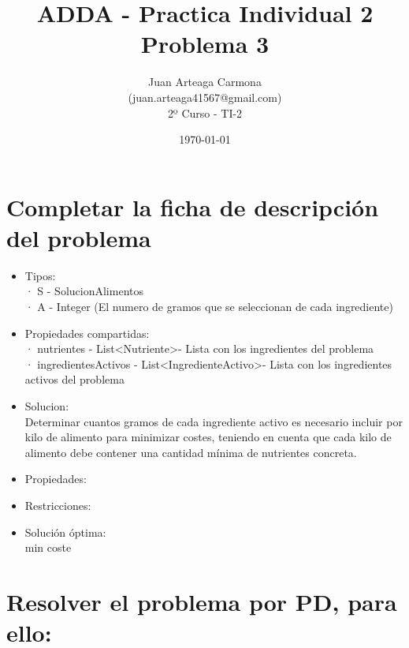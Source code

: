 \documentclass[a4paper,12pt]{article}
\title{ADDA - Practica Individual 2\\ Problema 3}
\author{Juan Arteaga Carmona\\(juan.arteaga41567@gmail.com)\\2º Curso - TI-2}
\date{\today}
\begin{document}
\maketitle

\section{Completar la ficha de descripción del problema}

\begin{itemize}
 \item Tipos:\\
 · S - SolucionAlimentos\\
 · A - Integer \in [0,1000] (El numero de gramos que se seleccionan de cada ingrediente)

 \item Propiedades compartidas:\\
 · nutrientes - List\textless Nutriente\textgreater - Lista con los ingredientes del problema\\
 · ingredientesActivos - List\textless IngredienteActivo\textgreater - Lista con los ingredientes activos del problema

 \item Solucion:\\
Determinar cuantos gramos de cada ingrediente activo es necesario incluir por kilo
de alimento para minimizar costes, teniendo en cuenta que cada kilo de alimento debe
contener una cantidad mínima de nutrientes concreta.

\item Propiedades:\\

\item Restricciones:

\item Solución óptima:\\
      min coste






\end{itemize}
\section{Resolver el problema por PD, para ello:}
\end{document}
